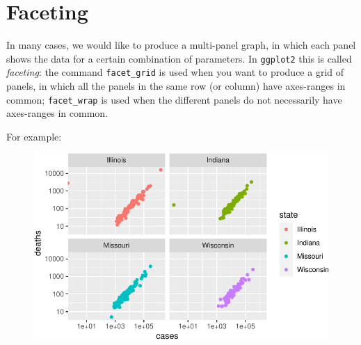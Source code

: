 \documentclass[
  letterpaper,
  DIV=11,
  numbers=noendperiod]{scrreprt}
\newenvironment{Shaded}{\begin{snugshade}}{\end{snugshade}}
\newcommand{\AttributeTok}[1]{\textcolor[rgb]{0.40,0.45,0.13}{#1}}
\newcommand{\FunctionTok}[1]{\textcolor[rgb]{0.28,0.35,0.67}{#1}}
\newcommand{\NormalTok}[1]{\textcolor[rgb]{0.00,0.23,0.31}{#1}}
\newcommand{\OtherTok}[1]{\textcolor[rgb]{0.00,0.23,0.31}{#1}}
\newcommand{\SpecialCharTok}[1]{\textcolor[rgb]{0.37,0.37,0.37}{#1}}
\newcommand{\StringTok}[1]{\textcolor[rgb]{0.13,0.47,0.30}{#1}}
\begin{document}
\hypertarget{faceting}{%
\section{Faceting}\label{faceting}}

In many cases, we would like to produce a multi-panel graph, in which
each panel shows the data for a certain combination of parameters. In
\texttt{ggplot2} this is called \emph{faceting}: the command
\texttt{facet\_grid} is used when you want to produce a grid of panels,
in which all the panels in the same row (or column) have axes-ranges in
common; \texttt{facet\_wrap} is used when the different panels do not
necessarily have axes-ranges in common.

For example:

\begin{Shaded}
\end{Shaded}

\begin{figure}[H]

{\centering \includegraphics{./01-dataviz_files/figure-pdf/unnamed-chunk-22-1.pdf}

}

\end{figure}
\end{document}
